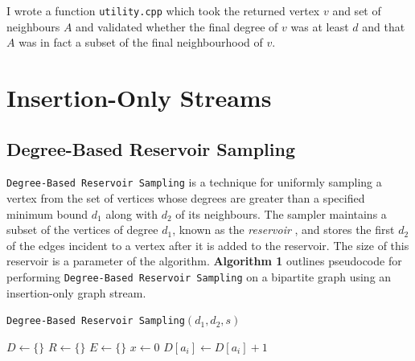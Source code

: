 \documentclass[11pt,twoside,a4paper]{report}
\begin{document}
\par I wrote a function \texttt{utility.cpp} which took the returned vertex $v$ and set of neighbours $A$ and validated whether the final degree of $v$ was at least $d$ and that $A$ was in fact a subset of the final neighbourhood of $v$.

\chapter{Insertion-Only Streams}

\section{Degree-Based Reservoir Sampling}

\texttt{Degree-Based Reservoir Sampling} is a technique for uniformly sampling a vertex from the set of vertices whose degrees are greater than a specified minimum bound $d_1$ along with $d_2$ of its neighbours. The sampler maintains a subset of the vertices of degree $d_1$, known as the \textit{reservoir} \cite{degResSampling}, and stores the first $d_2$ of the edges incident to a vertex after it is added to the reservoir. The size of this reservoir is a parameter of the algorithm. \textbf{Algorithm 1} outlines pseudocode for performing \texttt{Degree-Based Reservoir Sampling} on a bipartite graph using an insertion-only graph stream.

\begin{algorithm}[H]
	\caption{\texttt{Degree-Based Reservoir Sampling}$(d_1,d_2,s)$}
	$D\leftarrow\{\}$ 
	$R\leftarrow\{\}$ 
	$E\leftarrow\{\}$ 
	$x\leftarrow0$
	 {
		$D[a_i]\leftarrow D[a_i]+1$
	}
	 {
	} 
\end{algorithm}
\end{document}
